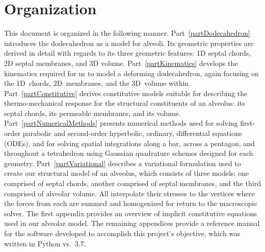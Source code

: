 \section{Organization}

This document is organized in the following manner.  Part~\ref{partDodecahedron} introduces the dodecahedron as a model for alveoli.  Its geometric properties are derived in detail with regards to its three geometric features: 1D septal chords, 2D septal membranes, and 3D volume.  Part~\ref{partKinematics} develops the kinematics required for us to model a deforming dodecahedron, again focusing on the 1D~chords, 2D~membranes, and the 3D~volume within.  Part~\ref{partConstitutive} derives constitutive models suitable for describing the thermo-mechanical response for the structural constituents of an alveolus: its septal chords, its permeable membranes, and its volume.  Part~\ref{partNumericalMethods} presents numerical methods used for solving first-order parabolic and second-order hyperbolic, ordinary, differential equations (ODEs), and for solving spatial integrations along a bar, across a pentagon, and throughout a tetrahedron using Gaussian quadrature schemes designed for each geometry.  Part~\ref{partVariational} describes a variational formulation used to create our structural model of an alveolus, which consists of three models: one comprised of septal chords, another comprised of septal membranes, and the third comprised of alveolar volume.  All interpolate their stresses to the vertices where the forces from each are summed and homogenized for return to the macroscopic solver.  The first appendix provides an overview of implicit constitutive equations used in our alveolar model.  The remaining appendices provide a reference manual for the software developed to accomplish this project's objective, which was written in Python vs.~3.7.
